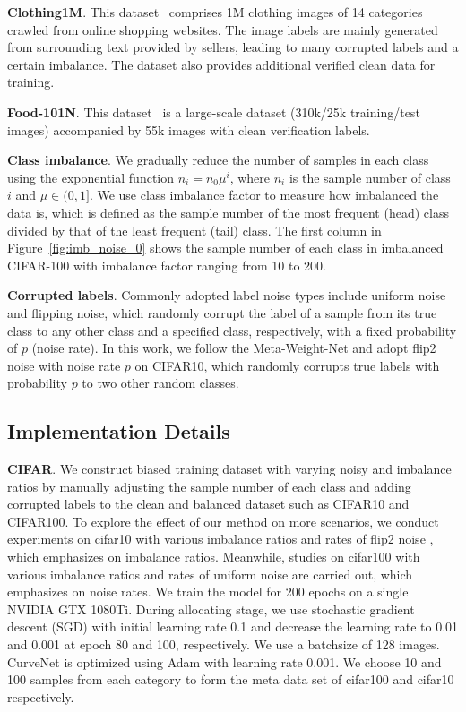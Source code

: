 \documentclass[letterpaper]{article} %
\newcommand{\bd}[1]{\textbf{#1}}
\begin{document}
\noindent\bd{Clothing1M}. This dataset~\cite{xiao2015learning} comprises 1M clothing images of 14 categories crawled from online shopping websites.
The image labels are mainly generated from surrounding text provided by sellers, leading to many corrupted labels and a certain imbalance.
The dataset also provides additional verified clean data for training.

\noindent\bd{Food-101N}. This dataset~\cite{lee2018cleannet} is a large-scale dataset (310k/25k training/test images) accompanied by 55k images with clean verification labels.


\noindent\bd{Class imbalance}. We gradually reduce the number of samples in each class using the exponential function $n_i=n_0\mu^i$, where $n_i$ is  the sample number of class $i$ and $\mu \in (0,1]$.
We use class imbalance factor to measure how imbalanced the data is, which is defined as the sample number of the most frequent (head) class divided by that of the least frequent (tail) class.
The first column in Figure~\ref{fig:imb_noise_0} shows the sample number of each class in imbalanced CIFAR-100 with imbalance factor ranging from 10 to 200.

\noindent\bd{Corrupted labels}.
Commonly adopted label noise types include uniform noise and flipping noise, which randomly corrupt the label of a sample from its true class to any other class and a specified class, respectively, with a fixed probability of $p$ (noise rate).
In this work, we follow the Meta-Weight-Net and adopt flip2 noise with noise rate $p$ on CIFAR10, which randomly corrupts true labels with probability $p$ to two other random classes.

\subsection{Implementation Details} \label{sec:implementaion}

\noindent\bd{CIFAR}. We construct biased training dataset with varying noisy and imbalance ratios by manually adjusting the sample number of each class and adding corrupted labels to the clean and balanced dataset such as CIFAR10 and CIFAR100.
{To explore the effect of our method on more scenarios, we conduct experiments on cifar10 with various imbalance ratios and rates of flip2 noise , which emphasizes on imbalance ratios.
Meanwhile, studies on cifar100 with various imbalance ratios and rates of uniform noise  are carried out, which emphasizes on noise rates.}
We train the model for 200 epochs on a single NVIDIA GTX 1080Ti.
During allocating stage, we use stochastic gradient descent (SGD) with initial learning rate 0.1 and decrease the learning rate to 0.01 and 0.001 at epoch 80 and 100, respectively.
We use a batchsize of 128 images. CurveNet is optimized using Adam with learning rate 0.001.
We choose 10 and 100 samples from each category to form the meta data set of cifar100 and cifar10 respectively.
\end{document}
